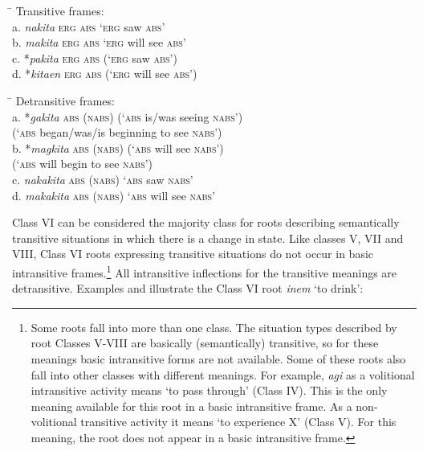 \ea
\label{bkm:Ref150170077}
\begin{tabbing}
\hspace{4.5cm} \= \kill
Transitive frames: \\
a.  \textit{nakita} \textsc{erg} \textsc{abs}  \>  ‘\textsc{erg} saw \textsc{abs}’ \\
b.  \textit{makita} \textsc{erg} \textsc{abs}  \>  ‘\textsc{erg} will see \textsc{abs}’ \\
c.  *\textit{pakita}\footnotemark{} \textsc{erg} \textsc{abs}  \>  (‘\textsc{erg} saw \textsc{abs}’) \\
d.  *\textit{kitaen} \textsc{erg} \textsc{abs}  \>  (‘\textsc{erg} will see \textsc{abs}’)
\end{tabbing}
\z
\ea
\label{bkm:Ref150170080}
\begin{tabbing}
\hspace{4.5cm} \= \kill
Detransitive frames: \\
a.  *\textit{gakita} \textsc{abs} (\textsc{nabs})  \>  (‘\textsc{abs} is/was seeing \textsc{nabs}’) \\
\>         (‘\textsc{abs} began/was/is beginning to see \textsc{nabs}’) \\
b.  *\textit{magkita} \textsc{abs} (\textsc{nabs})  \>  (‘\textsc{abs} will see \textsc{nabs}’) \\
\>         (‘\textsc{abs} will begin to see \textsc{nabs}’) \\
c.  \textit{nakakita} \textsc{abs} (\textsc{nabs})  \>  ‘\textsc{abs} saw \textsc{nabs}’ \\
d.  \textit{makakita} \textsc{abs} (\textsc{nabs})  \>  ‘\textsc{abs} will see \textsc{nabs}’
\end{tabbing}
\z

Class VI can be considered the majority class for roots describing semantically transitive situations in which there is a change in state. Like classes V, VII and VIII, Class VI roots expressing transitive situations do not occur in basic intransitive frames.\footnote{Some roots fall into more than one class. The situation types described by root Classes V-VIII are basically (semantically) transitive, so for these meanings basic intransitive forms are not available. Some of these roots also fall into other classes with different meanings. For example, \textit{agi} as a volitional intransitive activity means ‘to pass through’ (Class IV). This is the only meaning available for this root in a basic intransitive frame. As a non-volitional transitive activity it means ‘to experience X’ (Class V). For this meaning, the root does not appear in a basic intransitive frame.} All intransitive inflections for the transitive meanings are detransitive. Examples  and  illustrate the Class VI root \textit{inem} ‘to drink’:

